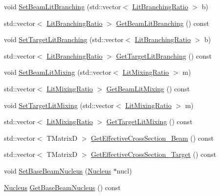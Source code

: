 \begin{DoxyCompactItemize}
\item 
void \hyperlink{classCoulExSimMinFCN_aa7c8b70cfc17e955422577b5ffa0a8f5}{Set\-Beam\-Lit\-Branching} (std\-::vector$<$ \hyperlink{classLitBranchingRatio}{Lit\-Branching\-Ratio} $>$ b)
\item 
std\-::vector$<$ \hyperlink{classLitBranchingRatio}{Lit\-Branching\-Ratio} $>$ \hyperlink{classCoulExSimMinFCN_a2822866831b72daa308d8b1c853e8274}{Get\-Beam\-Lit\-Branching} () const 
\item 
void \hyperlink{classCoulExSimMinFCN_a36fd7b603dcbefac4b15d29187930969}{Set\-Target\-Lit\-Branching} (std\-::vector$<$ \hyperlink{classLitBranchingRatio}{Lit\-Branching\-Ratio} $>$ b)
\item 
std\-::vector$<$ \hyperlink{classLitBranchingRatio}{Lit\-Branching\-Ratio} $>$ \hyperlink{classCoulExSimMinFCN_ad81ea12c8cfbbc9a2c59fe28e0a430bb}{Get\-Target\-Lit\-Branching} () const 
\item 
void \hyperlink{classCoulExSimMinFCN_a5fa7e2f84e13b26fab97e82b0015dd60}{Set\-Beam\-Lit\-Mixing} (std\-::vector$<$ \hyperlink{classLitMixingRatio}{Lit\-Mixing\-Ratio} $>$ m)
\item 
std\-::vector$<$ \hyperlink{classLitMixingRatio}{Lit\-Mixing\-Ratio} $>$ \hyperlink{classCoulExSimMinFCN_a04cbc0110cc3befed013eebd65fca59d}{Get\-Beam\-Lit\-Mixing} () const 
\item 
void \hyperlink{classCoulExSimMinFCN_a96a6f213caf7fa73ba04a51d654ed165}{Set\-Target\-Lit\-Mixing} (std\-::vector$<$ \hyperlink{classLitMixingRatio}{Lit\-Mixing\-Ratio} $>$ m)
\item 
std\-::vector$<$ \hyperlink{classLitMixingRatio}{Lit\-Mixing\-Ratio} $>$ \hyperlink{classCoulExSimMinFCN_ae9f2baf7684086906307827bc337874b}{Get\-Target\-Lit\-Mixing} () const 
\item 
std\-::vector$<$ T\-Matrix\-D $>$ \hyperlink{classCoulExSimMinFCN_a0b817c33cf489d186aebfc78bcde5774}{Get\-Effective\-Cross\-Section\-\_\-\-Beam} () const 
\item 
std\-::vector$<$ T\-Matrix\-D $>$ \hyperlink{classCoulExSimMinFCN_a581cefebd576c49c6730d20fd8d3b321}{Get\-Effective\-Cross\-Section\-\_\-\-Target} () const 
\item 
void \hyperlink{classCoulExSimMinFCN_a1a4fcd776281ea6fcae4ad6ef2d2f3cf}{Set\-Base\-Beam\-Nucleus} (\hyperlink{classNucleus}{Nucleus} $\ast$nucl)
\item 
\hyperlink{classNucleus}{Nucleus} \hyperlink{classCoulExSimMinFCN_acf3b8e0f60df6a84901bb9b7e869fb1e}{Get\-Base\-Beam\-Nucleus} () const 
\item 

\end{DoxyCompactItemize}
